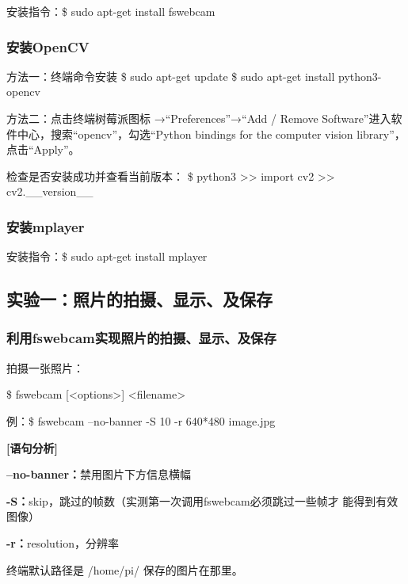 \documentclass{article}
\begin{document}
安装指令：\$ sudo apt-get install fswebcam



\subsubsection{安装OpenCV}

方法一：终端命令安装
\$ sudo apt-get update
\$ sudo apt-get install python3-opencv

方法二：点击终端树莓派图标 →“Preferences”→“Add / Remove Software”进入软件中心，搜索“opencv”，勾选“Python bindings for the computer vision library”，点击“Apply”。

检查是否安装成功并查看当前版本：
     \$ python3
     >> import cv2
     >> cv2.\_\_version\_\_
     
     
\subsubsection{安装mplayer}
安装指令：\$ sudo apt-get install mplayer



\subsection{实验一：照片的拍摄、显示、及保存}
\subsubsection{利用fswebcam实现照片的拍摄、显示、及保存}
拍摄一张照片：

     \$ fswebcam [<options>] <filename>
     
     例：\$ fswebcam --no-banner -S 10 -r 640*480 image.jpg
     
\textbf{[语句分析]}

    \textbf{ --no-banner：}禁用图片下方信息横幅
     
  \textbf{   -S：}skip，跳过的帧数（实测第一次调用fswebcam必须跳过一些帧才
     能得到有效图像）
     
    \textbf{ -r：}resolution，分辨率
 

终端默认路径是 /home/pi/      保存的图片在那里。
\end{document}
